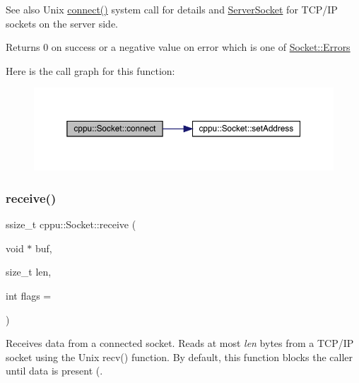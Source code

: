 \begin{DoxySeeAlso}{See also}
Unix \mbox{\hyperlink{classcppu_1_1_socket_af6db3840caee709738f0e2a9ff814e5d}{connect()}} system call for details and \mbox{\hyperlink{classcppu_1_1_server_socket}{Server\+Socket}} for T\+C\+P/\+IP sockets on the server side. 
\end{DoxySeeAlso}
\begin{DoxyReturn}{Returns}
0 on success or a negative value on error which is one of \mbox{\hyperlink{classcppu_1_1_socket_a49ea5cb079bd7ae97ecf7eb30c9d9e5f}{Socket\+::\+Errors}} 
\end{DoxyReturn}
Here is the call graph for this function\+:
\nopagebreak
\begin{figure}[H]
\begin{center}
\leavevmode
\includegraphics[width=350pt]{classcppu_1_1_socket_af6db3840caee709738f0e2a9ff814e5d_cgraph}
\end{center}
\end{figure}
\mbox{\label{classcppu_1_1_socket_a37c382af52cc02f92c0e19a0c6e0e04f}} 
\subsubsection{\texorpdfstring{receive()}{receive()}}
{\footnotesize\ttfamily ssize\+\_\+t cppu\+::\+Socket\+::receive (\begin{DoxyParamCaption}\item[{void $\ast$}]{buf,  }\item[{size\+\_\+t}]{len,  }\item[{int}]{flags = {} }\end{DoxyParamCaption})\hspace{0.3cm}{\ttfamily [inline]}}



Receives data from a connected socket. Reads at most {\itshape len} bytes from a T\+C\+P/\+IP socket using the Unix recv() function. By default, this function blocks the caller until data is present (. 


